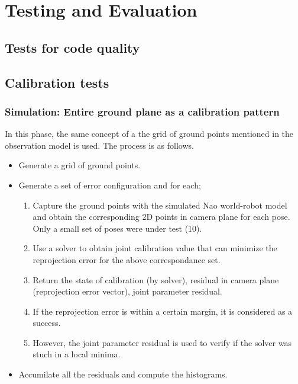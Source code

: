 \documentclass[english, printversion, nomenclature, notitle]{tuvisionthesis} %
\begin{document}
\chapter{Testing and Evaluation}
\section{Tests for code quality}
\section{Calibration tests}
\subsection{Simulation: Entire ground plane as a calibration pattern}
\label{subsec:simGroundTest}
In this phase, the same concept of a the grid of ground points mentioned in the observation model is used. The process is as follows.

\begin{itemize}
	\item Generate a grid of ground points.
	\item Generate a set of error configuration and for each;
	\begin{enumerate}
		\item Capture the ground points with the simulated Nao world-robot model and obtain the corresponding 2D points in camera plane for each pose. Only a small set of poses were under test (10).
		\item Use a solver to obtain joint calibration value that can minimize the reprojection error for the above correspondance set.
		\item Return the state of calibration (by solver), residual in camera plane (reprojection error vector), joint parameter residual.
		\item If the reprojection error is within a certain margin, it is considered as a success.
		\item However, the joint parameter residual is used to verify if the solver was stuch in a local minima.
	\end{enumerate}
	\item Accumilate all the residuals and compute the histograms.
\end{itemize}
\end{document}
